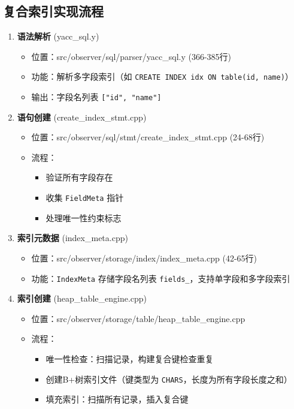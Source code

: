 \documentclass[a4paper, 12pt]{article}
\begin{document}
\subsection{复合索引实现流程}
\begin{enumerate}
    \item \textbf{语法解析} (yacc\_sql.y)
    \begin{itemize}
        \item 位置：src/observer/sql/parser/yacc\_sql.y (366-385行)
        \item 功能：解析多字段索引（如 \texttt{CREATE INDEX idx ON table(id, name)}）
        \item 输出：字段名列表 \texttt{["id", "name"]}
    \end{itemize}
    
    \item \textbf{语句创建} (create\_index\_stmt.cpp)
    
\begin{itemize}
        \item 位置：src/observer/sql/stmt/create\_index\_stmt.cpp (24-68行)
        \item 流程：
        \begin{itemize}
            \item 验证所有字段存在
            \item 收集 \texttt{FieldMeta} 指针
            \item 处理唯一性约束标志
        \end{itemize}
    \end{itemize}
    
    \item \textbf{索引元数据} (index\_meta.cpp)
    
\begin{itemize}
        \item 位置：src/observer/storage/index/index\_meta.cpp (42-65行)
        \item 功能：\texttt{IndexMeta} 存储字段名列表 \texttt{fields\_}，支持单字段和多字段索引
    \end{itemize}
    
    \item \textbf{索引创建} (heap\_table\_engine.cpp)
    
\begin{itemize}
        \item 位置：src/observer/storage/table/heap\_table\_engine.cpp
        \item 流程：
        \begin{itemize}
            \item 唯一性检查：扫描记录，构建复合键检查重复
            \item 创建B+树索引文件（键类型为 \texttt{CHARS}，长度为所有字段长度之和）
            \item 填充索引：扫描所有记录，插入复合键
        \end{itemize}
    \end{itemize}
    

\end{enumerate}
\end{document}
